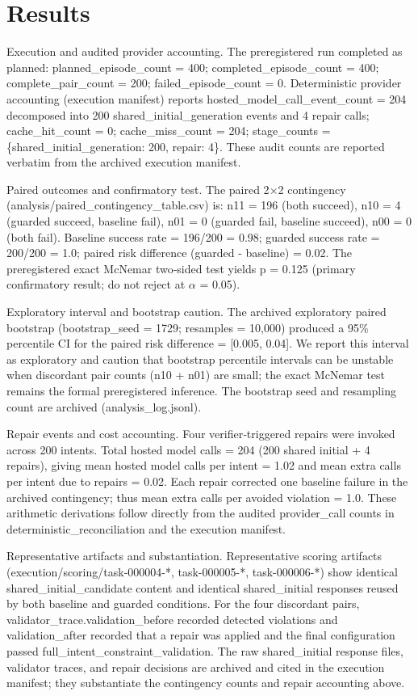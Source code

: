 \documentclass[conference]{IEEEtran}
\begin{document}
\section{Results}
Execution and audited provider accounting. The preregistered run completed as planned: planned\_episode\_count = 400; completed\_episode\_count = 400; complete\_pair\_count = 200; failed\_episode\_count = 0. Deterministic provider accounting (execution manifest) reports hosted\_model\_call\_event\_count = 204 decomposed into 200 shared\_initial\_generation events and 4 repair calls; cache\_hit\_count = 0; cache\_miss\_count = 204; stage\_counts = \{shared\_initial\_generation: 200, repair: 4\}. These audit counts are reported verbatim from the archived execution manifest.

Paired outcomes and confirmatory test. The paired 2\ensuremath{\times}2 contingency (analysis/paired\_contingency\_table.csv) is: n11 = 196 (both succeed), n10 = 4 (guarded succeed, baseline fail), n01 = 0 (guarded fail, baseline succeed), n00 = 0 (both fail). Baseline success rate = 196/200 = 0.98; guarded success rate = 200/200 = 1.0; paired risk difference (guarded - baseline) = 0.02. The preregistered exact McNemar two‑sided test yields p = 0.125 (primary confirmatory result; do not reject at \ensuremath{\alpha} = 0.05).

Exploratory interval and bootstrap caution. The archived exploratory paired bootstrap (bootstrap\_seed = 1729; resamples = 10,000) produced a 95\% percentile CI for the paired risk difference = [0.005, 0.04]. We report this interval as exploratory and caution that bootstrap percentile intervals can be unstable when discordant pair counts (n10 + n01) are small; the exact McNemar test remains the formal preregistered inference. The bootstrap seed and resampling count are archived (analysis\_log.jsonl).

Repair events and cost accounting. Four verifier‑triggered repairs were invoked across 200 intents. Total hosted model calls = 204 (200 shared initial + 4 repairs), giving mean hosted model calls per intent = 1.02 and mean extra calls per intent due to repairs = 0.02. Each repair corrected one baseline failure in the archived contingency; thus mean extra calls per avoided violation = 1.0. These arithmetic derivations follow directly from the audited provider\_call counts in deterministic\_reconciliation and the execution manifest.

Representative artifacts and substantiation. Representative scoring artifacts (execution/scoring/task-000004-*, task-000005-*, task-000006-*) show identical shared\_initial\_candidate content and identical shared\_initial responses reused by both baseline and guarded conditions. For the four discordant pairs, validator\_trace.validation\_before recorded detected violations and validation\_after recorded that a repair was applied and the final configuration passed full\_intent\_constraint\_validation. The raw shared\_initial response files, validator traces, and repair decisions are archived and cited in the execution manifest; they substantiate the contingency counts and repair accounting above.
\end{document}
